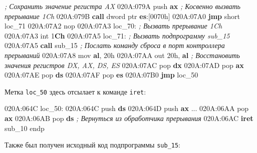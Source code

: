 \documentclass[
]{article}
\newenvironment{Shaded}{}{}
\newcommand{\BaseNTok}[1]{\textcolor[rgb]{0.25,0.63,0.44}{#1}}
\newcommand{\BuiltInTok}[1]{\textcolor[rgb]{0.00,0.50,0.00}{#1}}
\newcommand{\CommentTok}[1]{\textcolor[rgb]{0.38,0.63,0.69}{\textit{#1}}}
\newcommand{\ControlFlowTok}[1]{\textcolor[rgb]{0.00,0.44,0.13}{\textbf{#1}}}
\newcommand{\DataTypeTok}[1]{\textcolor[rgb]{0.56,0.13,0.00}{#1}}
\newcommand{\DecValTok}[1]{\textcolor[rgb]{0.25,0.63,0.44}{#1}}
\newcommand{\ErrorTok}[1]{\textcolor[rgb]{1.00,0.00,0.00}{\textbf{#1}}}
\newcommand{\KeywordTok}[1]{\textcolor[rgb]{0.00,0.44,0.13}{\textbf{#1}}}
\newcommand{\NormalTok}[1]{#1}
\newcommand{\OperatorTok}[1]{\textcolor[rgb]{0.40,0.40,0.40}{#1}}
\begin{document}
\begin{Shaded}
\begin{Highlighting}[]
\CommentTok{; Сохранить значение регистра AX}
\NormalTok{020A:079A }\BuiltInTok{push} \KeywordTok{ax}
\CommentTok{; Косвенно вызвать прерывание 1Ch}
\NormalTok{020A:079B }\ControlFlowTok{call} \DataTypeTok{dword} \DataTypeTok{ptr} \KeywordTok{es}\OperatorTok{:[}\BaseNTok{0070h}\OperatorTok{]}
\NormalTok{020A:07A0 }\ControlFlowTok{jmp} \OperatorTok{short}\NormalTok{ loc\_71}
\NormalTok{020A:07A2 }\BuiltInTok{nop}
\NormalTok{020A:07A3 loc\_70}\OperatorTok{:}
\CommentTok{; Вызвать прерывание 1Ch}
\NormalTok{020A:07A3 }\BuiltInTok{int} \DecValTok{1}\ErrorTok{Ch}
\NormalTok{020A:07A5 loc\_71}\OperatorTok{:}
\CommentTok{; Вызвать подпрограмму sub\_15}
\NormalTok{020A:07A5 }\ControlFlowTok{call}\NormalTok{ sub\_15}
\CommentTok{; Послать команду сброса в порт контроллера прерываний}
\NormalTok{020A:07A8 }\BuiltInTok{mov} \KeywordTok{al}\OperatorTok{,} \BaseNTok{20h}
\NormalTok{020A:07AA }\BuiltInTok{out} \BaseNTok{20h}\OperatorTok{,} \KeywordTok{al}
\CommentTok{; Восстановить значения регистров DX, AX, DS, ES}
\NormalTok{020A:07AC }\BuiltInTok{pop} \KeywordTok{dx}
\NormalTok{020A:07AD }\BuiltInTok{pop} \KeywordTok{ax}
\NormalTok{020A:07AE }\BuiltInTok{pop} \KeywordTok{ds}
\NormalTok{020A:07AF }\BuiltInTok{pop} \KeywordTok{es}
\NormalTok{020A:07B0 }\ControlFlowTok{jmp}\NormalTok{ loc\_50}
\end{Highlighting}
\end{Shaded}

Метка \texttt{loc\_50} здесь отсылает к команде \texttt{iret}:

\begin{Shaded}
\begin{Highlighting}[]
\NormalTok{020A:064C loc\_50}\OperatorTok{:}
\NormalTok{020A:064C }\BuiltInTok{push} \KeywordTok{ds}
\NormalTok{020A:064D }\BuiltInTok{push} \KeywordTok{ax}
\NormalTok{...}
\NormalTok{020A:06AA }\BuiltInTok{pop} \KeywordTok{ax}
\NormalTok{020A:06AB }\BuiltInTok{pop} \KeywordTok{ds}
\CommentTok{; Вернуться из обработчика прерывания}
\NormalTok{020A:06AC }\ControlFlowTok{iret}
\NormalTok{sub\_10 endp}
\end{Highlighting}
\end{Shaded}

Также был получен исходный код подпрограммы \texttt{sub\_15}:
\end{document}
